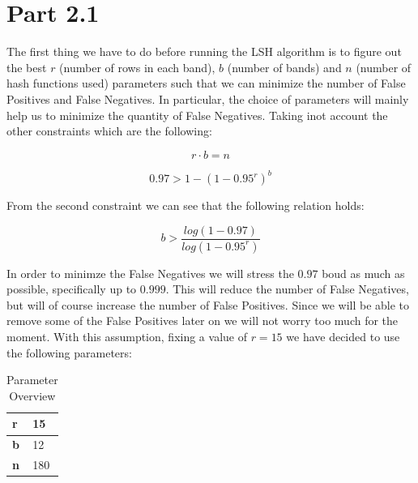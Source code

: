\documentclass[12pt]{article}
\begin{document}
\section{Part 2.1}

The first thing we have to do before running the LSH algorithm is to figure out the best $r$ (number of rows in each band), $b$ (number of bands) and $n$ (number of hash functions used) parameters such that we can minimize the number of False Positives and False Negatives. In particular, the choice of parameters will mainly help us to minimize the quantity of False Negatives. Taking inot account the other constraints which are the following:

\begin{equation}
r \cdot b = n
\end{equation}


\begin{equation}
0.97 > 1 - (1-0.95^r)^b
\end{equation}

From the second constraint we can see that the following relation holds:

\begin{equation}
b > \frac{log(1-0.97)}{log(1-0.95^r)}
\end{equation}

In order to minimze the False Negatives we will stress the $0.97$ boud as much as possible, specifically up to $0.999$. This will reduce the number of False Negatives, but will of course increase the number of False Positives. Since we will be able to remove some of the False Positives later on we will not worry too much for the moment. With this assumption, fixing a value of $r=15$ we have decided to use the following parameters:

\begin{table}[H]
\centering
\begin{tabular}{|l|l|}
\hline
\textbf{r} & 15    \\ \hline
\textbf{b} & 12   \\ \hline
\textbf{n} & 180 \\ \hline
\end{tabular}
\caption{Parameter Overview}
\label{tab:my-table}
\end{table}
\end{document}
